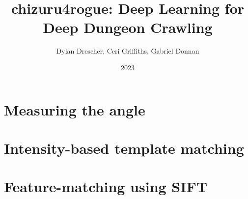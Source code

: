\documentclass[11pt,a4paper]{article}
\begin{document}
    \title{chizuru4rogue: Deep Learning for Deep Dungeon Crawling}
    \author{Dylan Drescher, Ceri Griffiths, Gabriel Donnan}
    \date{2023}
    \maketitle

    \section{Measuring the angle}
    \section{Intensity-based template matching}
    \section{Feature-matching using SIFT}
    
    \medskip
    
    
    
\end{document}
